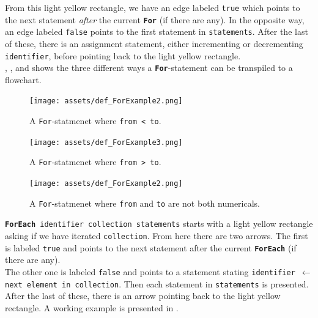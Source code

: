 From this light yellow rectangle, we have an edge labeled \texttt{true} which points to the next statement \textit{after} the current \texttt{\textbf{For}} (if there are any). In the opposite way, an edge labeled \texttt{false} points to the first statement in \texttt{statements}. After the last of these, there is an assignment statement, either incrementing or decrementing \texttt{identifier}, before pointing back to the light yellow rectangle. \\

, , and  shows the three different ways a \texttt{\textbf{For}}-statement can be transpiled to a flowchart. \\

\begin{figure}[ht]
    \centering
    \texttt{[image: assets/def\_ForExample2.png]}
    \caption{A \texttt{For}-statmenet where \texttt{from < to}.}
    \label{forExample1}
\end{figure}

\begin{figure}[ht]
    \centering
    \texttt{[image: assets/def\_ForExample3.png]}
    \caption{A \texttt{For}-statmenet where \texttt{from > to}.}
    \label{forExample2}
\end{figure}

\begin{figure}[ht!]
    \centering
    \texttt{[image: assets/def\_ForExample2.png]}
    \caption{A \texttt{For}-statmenet where \texttt{from} and \texttt{to} are not both numericals.}
    \label{forExample3}
\end{figure}


\texttt{\textbf{ForEach} identifier collection statements} starts with a light yellow rectangle asking if we have iterated \texttt{collection}. From here there are two arrows. The first is labeled \texttt{true} and points to the next statement after the current \texttt{\textbf{ForEach}} (if there are any). \\

The other one is labeled \texttt{false} and points to a statement stating \texttt{identifier $\gets$ next element in collection}. Then each statement in \texttt{statements} is presented. After the last of these, there is an arrow pointing back to the light yellow rectangle. A working example is presented in . \\

